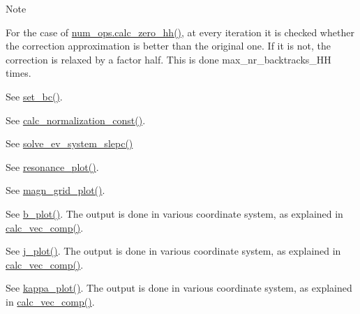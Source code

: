 \begin{DoxyNote}{Note}
\begin{DoxyEnumerate}
\item \label{page_inputs_fni9}%
%
For the case of \hyperlink{interfacenum__ops_1_1calc__zero__hh}{num\+\_\+ops.\+calc\+\_\+zero\+\_\+hh()}, at every iteration it is checked whether the correction approximation is better than the original one. If it is not, the correction is relaxed by a factor half. This is done {\ttfamily max\+\_\+nr\+\_\+backtracks\+\_\+\+HH} times.
\item \label{page_inputs_fni10}%
%
See \hyperlink{namespaceslepc__ops_a05f8a23335ed47ad1996cddf3bcfdc2e}{set\+\_\+bc()}.
\item \label{page_inputs_fni11}%
%
See \hyperlink{namespaceeq__ops_a7cd38586e386e1bc684a327ebcc4c1de}{calc\+\_\+normalization\+\_\+const()}.
\item \label{page_inputs_fni12}%
%
See \hyperlink{namespaceslepc__ops_a79c420987056c225931b51c8d30ece1f}{solve\+\_\+ev\+\_\+system\+\_\+slepc()}
\item \label{page_inputs_fni13}%
%
See \hyperlink{namespacex__ops_abdaf1308e13cede3a153e8c6cf35a637}{resonance\+\_\+plot()}.
\item \label{page_inputs_fni14}%
%
See \hyperlink{namespacegrid__ops_addd76b7b3be0b51e0863ae0cdfef41e6}{magn\+\_\+grid\+\_\+plot()}.
\item \label{page_inputs_fni15}%
%
See \hyperlink{namespaceeq__ops_a73a8c3cea1e8a636b4978bc626e0fab0}{b\+\_\+plot()}. The output is done in various coordinate system, as explained in \hyperlink{namespacegrid__utilities_ad3d9386b9abcb1a7e17369a1b3a3750d}{calc\+\_\+vec\+\_\+comp()}.
\item \label{page_inputs_fni16}%
%
See \hyperlink{namespaceeq__ops_afabdf28e5c26ceb87e6eb8cf3809919d}{j\+\_\+plot()}. The output is done in various coordinate system, as explained in \hyperlink{namespacegrid__utilities_ad3d9386b9abcb1a7e17369a1b3a3750d}{calc\+\_\+vec\+\_\+comp()}.
\item \label{page_inputs_fni17}%
%
See \hyperlink{namespaceeq__ops_ad173efd111cb85c11bc2bc78a7555096}{kappa\+\_\+plot()}. The output is done in various coordinate system, as explained in \hyperlink{namespacegrid__utilities_ad3d9386b9abcb1a7e17369a1b3a3750d}{calc\+\_\+vec\+\_\+comp()}.
\item \label{page_inputs_fni18}%
%

\end{DoxyEnumerate}
\end{DoxyNote}

